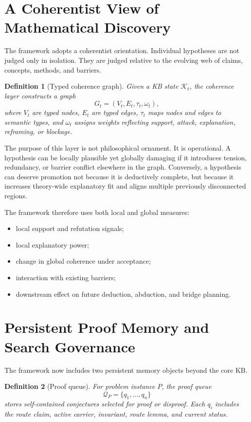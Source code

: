 \documentclass[11pt]{article}
\newtheorem{definition}{Definition}
\begin{document}
\section{A Coherentist View of Mathematical Discovery}

The framework adopts a coherentist orientation. Individual hypotheses are not judged only in isolation. They are judged relative to the evolving web of claims, concepts, methods, and barriers.

\begin{definition}[Typed coherence graph]
Given a KB state $\mathcal{K}_t$, the coherence layer constructs a graph
\[
G_t = (V_t, E_t, \tau_t, \omega_t),
\]
where $V_t$ are typed nodes, $E_t$ are typed edges, $\tau_t$ maps nodes and edges to semantic types, and $\omega_t$ assigns weights reflecting support, attack, explanation, reframing, or blockage.
\end{definition}

The purpose of this layer is not philosophical ornament. It is operational. A hypothesis can be locally plausible yet globally damaging if it introduces tension, redundancy, or barrier conflict elsewhere in the graph. Conversely, a hypothesis can deserve promotion not because it is deductively complete, but because it increases theory-wide explanatory fit and aligns multiple previously disconnected regions.

The framework therefore uses both local and global measures:

\begin{itemize}[leftmargin=*,itemsep=0.2em]
\item local support and refutation signals;
\item local explanatory power;
\item change in global coherence under acceptance;
\item interaction with existing barriers;
\item downstream effect on future deduction, abduction, and bridge planning.
\end{itemize}

\section{Persistent Proof Memory and Search Governance}

The framework now includes two persistent memory objects beyond the core KB.

\begin{definition}[Proof queue]
For problem instance $P$, the proof queue
\[
\mathcal{Q}_P = \{ q_1, \dots, q_n \}
\]
stores self-contained conjectures selected for proof or disproof. Each $q_i$ includes the route claim, active carrier, invariant, route lemma, and current status.
\end{definition}
\end{document}
